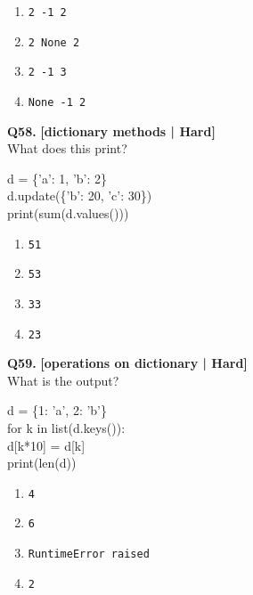 \begin{enumerate}[label=(\alph*),topsep=2pt,itemsep=1pt,partopsep=0pt,parsep=0pt]
    \item \relax \texttt{2 -1 2}
    \item \relax \texttt{2 None 2}
    \item \relax \texttt{2 -1 3}
    \item \relax \texttt{None -1 2}
\end{enumerate}
\vspace{2mm}

\noindent\textbf{Q58.} \hfill {\small\color{LPUOrange}\textbf{[dictionary methods | Hard]}}\\[2pt]
What does this print? 

\begin{pycode}
d = \{'a': 1, 'b': 2\}\\
d.update(\{'b': 20, 'c': 30\})\\
print(sum(d.values()))
\end{pycode}

\begin{enumerate}[label=(\alph*),topsep=2pt,itemsep=1pt,partopsep=0pt,parsep=0pt]
    \item \relax \texttt{51}
    \item \relax \texttt{53}
    \item \relax \texttt{33}
    \item \relax \texttt{23}
\end{enumerate}
\vspace{2mm}

\noindent\textbf{Q59.} \hfill {\small\color{LPUOrange}\textbf{[operations on dictionary | Hard]}}\\[2pt]
What is the output? 

\begin{pycode}
d = \{1: 'a', 2: 'b'\}\\
for k in list(d.keys()):\\
d[k*10] = d[k]\\
print(len(d))
\end{pycode}

\begin{enumerate}[label=(\alph*),topsep=2pt,itemsep=1pt,partopsep=0pt,parsep=0pt]
    \item \relax \texttt{4}
    \item \relax \texttt{6}
    \item \relax \texttt{RuntimeError raised}
    \item \relax \texttt{2}
\end{enumerate}
\vspace{2mm}

